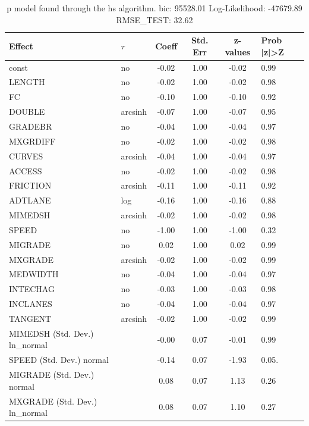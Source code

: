 \begin{table}
	\caption{p model found through the hs algorithm. bic: 95528.01 Log-Likelihood: -47679.89 RMSE_TEST: 32.62}
	\begin{center}
		\begin{tabular}{|l|l|c|c|c|l|}
			\hline
			Effect & $\tau$ & Coeff & Std. Err & z-values & Prob |z|>Z \\
			\hline
			const & no & -0.02 & 1.00 & -0.02 & 0.99 \\
			\hline
			LENGTH & no & -0.02 & 1.00 & -0.02 & 0.98 \\
			\hline
			FC & no & -0.10 & 1.00 & -0.10 & 0.92 \\
			\hline
			DOUBLE & arcsinh & -0.07 & 1.00 & -0.07 & 0.95 \\
			\hline
			GRADEBR & no & -0.04 & 1.00 & -0.04 & 0.97 \\
			\hline
			MXGRDIFF & no & -0.02 & 1.00 & -0.02 & 0.98 \\
			\hline
			CURVES & arcsinh & -0.04 & 1.00 & -0.04 & 0.97 \\
			\hline
			ACCESS & no & -0.02 & 1.00 & -0.02 & 0.98 \\
			\hline
			FRICTION & arcsinh & -0.11 & 1.00 & -0.11 & 0.92 \\
			\hline
			ADTLANE & log & -0.16 & 1.00 & -0.16 & 0.88 \\
			\hline
			MIMEDSH & arcsinh & -0.02 & 1.00 & -0.02 & 0.98 \\
			\hline
			SPEED & no & -1.00 & 1.00 & -1.00 & 0.32 \\
			\hline
			MIGRADE & no & 0.02 & 1.00 & 0.02 & 0.99 \\
			\hline
			MXGRADE & arcsinh & -0.02 & 1.00 & -0.02 & 0.99 \\
			\hline
			MEDWIDTH & no & -0.04 & 1.00 & -0.04 & 0.97 \\
			\hline
			INTECHAG & no & -0.03 & 1.00 & -0.03 & 0.98 \\
			\hline
			INCLANES & no & -0.04 & 1.00 & -0.04 & 0.97 \\
			\hline
			TANGENT & arcsinh & -0.02 & 1.00 & -0.02 & 0.99 \\
			\hline
			MIMEDSH (Std. Dev.) ln_normal &  & -0.00 & 0.07 & -0.01 & 0.99 \\
			\hline
			SPEED (Std. Dev.) normal &  & -0.14 & 0.07 & -1.93 & 0.05. \\
			\hline
			MIGRADE (Std. Dev.) normal &  & 0.08 & 0.07 & 1.13 & 0.26 \\
			\hline
			MXGRADE (Std. Dev.) ln_normal &  & 0.08 & 0.07 & 1.10 & 0.27 \\

\end{tabular}
\end{center}
\end{table}
